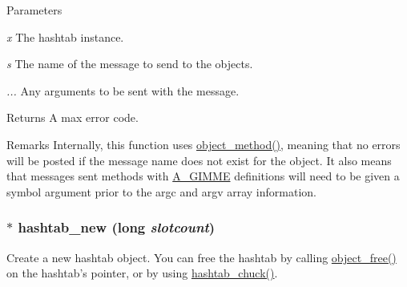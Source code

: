 \begin{DoxyParams}{Parameters}
\item[{\em x}]The hashtab instance. \item[{\em s}]The name of the message to send to the objects. \item[{\em ...}]Any arguments to be sent with the message. \end{DoxyParams}
\begin{DoxyReturn}{Returns}
A max error code.
\end{DoxyReturn}
\begin{DoxyRemark}{Remarks}
Internally, this function uses \hyperlink{group__obj_gae740749094827ac5adc2b7145db1c596}{object\_\-method()}, meaning that no errors will be posted if the message name does not exist for the object. It also means that messages sent methods with \hyperlink{group__atom_gga8aa6700e9f00b132eb376db6e39ade47a81c1a8550f038db16a619167a70a79b6}{A\_\-GIMME} definitions will need to be given a symbol argument prior to the argc and argv array information. 
\end{DoxyRemark}
\hypertarget{group__hashtab_ga70be9bbfb9bd9383824df0832477267f}{
\subsubsection[{hashtab\_\-new}]{$\ast$ hashtab\_\-new (long {\em slotcount})}}
\label{group__hashtab_ga70be9bbfb9bd9383824df0832477267f}


Create a new hashtab object. You can free the hashtab by calling \hyperlink{group__obj_ga3759846cb356195532c41e35b87522ee}{object\_\-free()} on the hashtab's pointer, or by using \hyperlink{group__hashtab_gac3203c76c8321cde39088beab8b4d2e8}{hashtab\_\-chuck()}.


